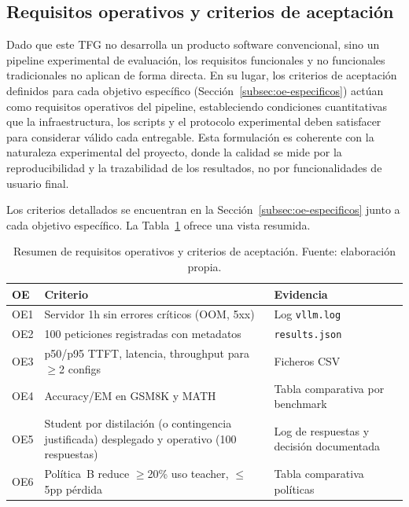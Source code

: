 \documentclass[11pt,a4paper]{article}
\begin{document}
\subsection{Requisitos operativos y criterios de aceptación}

Dado que este TFG no desarrolla un producto software convencional, sino un pipeline experimental de evaluación, los requisitos funcionales y no funcionales tradicionales no aplican de forma directa. En su lugar, los criterios de aceptación definidos para cada objetivo específico (Sección~\ref{subsec:oe-especificos}) actúan como requisitos operativos del pipeline, estableciendo condiciones cuantitativas que la infraestructura, los scripts y el protocolo experimental deben satisfacer para considerar válido cada entregable. Esta formulación es coherente con la naturaleza experimental del proyecto, donde la calidad se mide por la reproducibilidad y la trazabilidad de los resultados, no por funcionalidades de usuario final.

Los criterios detallados se encuentran en la Sección~\ref{subsec:oe-especificos} junto a cada objetivo específico. La Tabla~\ref{tab:acceptance} ofrece una vista resumida.

\begin{table}[H]
\centering
\caption{Resumen de requisitos operativos y criterios de aceptación. Fuente: elaboración propia.}
\label{tab:acceptance}
\footnotesize
\setlength{\tabcolsep}{4pt}
\begin{tabularx}{\textwidth}{>{\raggedright\arraybackslash}p{1cm} X >{\raggedright\arraybackslash}p{4.5cm}}
\toprule
\textbf{OE} & \textbf{Criterio} & \textbf{Evidencia} \\
\midrule
OE1 & Servidor 1h sin errores críticos (OOM, 5xx) & Log \texttt{vllm.log} \\
OE2 & 100 peticiones registradas con metadatos & \texttt{results.json} \\
OE3 & p50/p95 TTFT, latencia, throughput para $\geq$2 configs & Ficheros CSV \\
OE4 & Accuracy/EM en GSM8K y MATH & Tabla comparativa por benchmark \\
OE5 & Student por distilación (o contingencia justificada) desplegado y operativo (100 respuestas) & Log de respuestas y decisión documentada \\
OE6 & Política~B reduce $\geq$20\% uso teacher, $\leq$5pp pérdida & Tabla comparativa políticas \\
\bottomrule
\end{tabularx}
\end{table}
\end{document}
